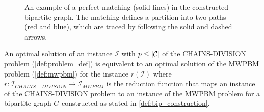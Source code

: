 \begin{example}
\begin{figure}[H]
        \caption{An example of a perfect matching (solid lines) in the constructed bipartite graph. The matching defines a partition into two paths (red and blue), which are traced by following the solid and dashed arrows.}
        \label{fig:example_bipartite_read}
    \end{figure}
\end{example}

\begin{theorem}
    An optimal solution of an instance $\mathcal I$ with $p \leq |\mathcal{C}|$ of the \textsc{CHAINS-DIVISION} problem (\cref{def:problem_def}) is equivalent to an optimal solution of the \textsc{MWPBM} problem (\cref{def:mwpbm}) for the instance $r(\mathcal I)$ where $r: \mathcal{I}_{CHAINS-DIVISION} \rightarrow \mathcal{I}_{MWPBM}$ is the reduction function that maps an instance of the CHAINS-DIVISION problem to an instance of the MWPBM problem for a bipartite graph $G$ constructed as stated in \cref{def:bip_construction}.
\end{theorem}

